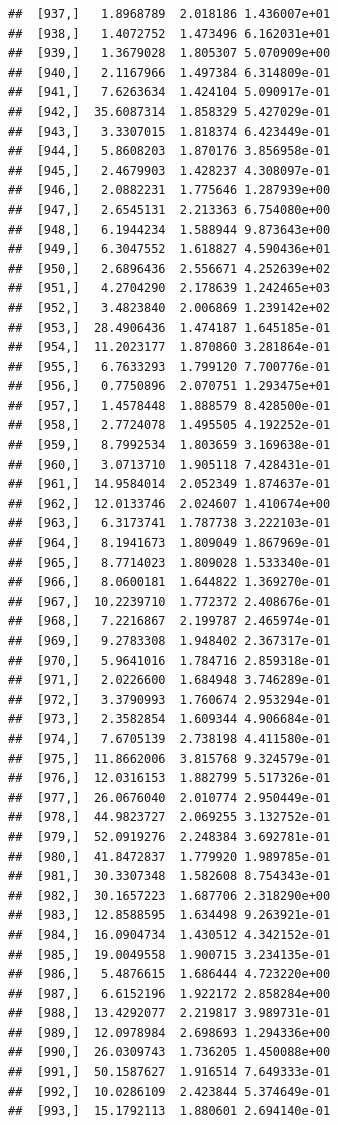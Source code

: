 \documentclass[article]{jss}\usepackage[]{graphicx}\usepackage[]{xcolor}
\makeatletter
\newenvironment{kframe}{%
 \def\at@end@of@kframe{}%
 \ifinner\ifhmode%
  \def\at@end@of@kframe{\end{minipage}}%
  \begin{minipage}{\columnwidth}%
 \fi\fi%
 \def\FrameCommand##1{\hskip\@totalleftmargin \hskip-\fboxsep
 \colorbox{shadecolor}{##1}\hskip-\fboxsep
     \hskip-\linewidth \hskip-\@totalleftmargin \hskip\columnwidth}%
 \MakeFramed {\advance\hsize-\width
   \@totalleftmargin\z@ \linewidth\hsize
   \@setminipage}}%
 {\par\unskip\endMakeFramed%
 \at@end@of@kframe}
\newenvironment{knitrout}{}{} %
\makeatother
\begin{document}
\begin{knitrout}
\begin{kframe}
\begin{verbatim}
##  [937,]   1.8968789  2.018186 1.436007e+01
##  [938,]   1.4072752  1.473496 6.162031e+01
##  [939,]   1.3679028  1.805307 5.070909e+00
##  [940,]   2.1167966  1.497384 6.314809e-01
##  [941,]   7.6263634  1.424104 5.090917e-01
##  [942,]  35.6087314  1.858329 5.427029e-01
##  [943,]   3.3307015  1.818374 6.423449e-01
##  [944,]   5.8608203  1.870176 3.856958e-01
##  [945,]   2.4679903  1.428237 4.308097e-01
##  [946,]   2.0882231  1.775646 1.287939e+00
##  [947,]   2.6545131  2.213363 6.754080e+00
##  [948,]   6.1944234  1.588944 9.873643e+00
##  [949,]   6.3047552  1.618827 4.590436e+01
##  [950,]   2.6896436  2.556671 4.252639e+02
##  [951,]   4.2704290  2.178639 1.242465e+03
##  [952,]   3.4823840  2.006869 1.239142e+02
##  [953,]  28.4906436  1.474187 1.645185e-01
##  [954,]  11.2023177  1.870860 3.281864e-01
##  [955,]   6.7633293  1.799120 7.700776e-01
##  [956,]   0.7750896  2.070751 1.293475e+01
##  [957,]   1.4578448  1.888579 8.428500e-01
##  [958,]   2.7724078  1.495505 4.192252e-01
##  [959,]   8.7992534  1.803659 3.169638e-01
##  [960,]   3.0713710  1.905118 7.428431e-01
##  [961,]  14.9584014  2.052349 1.874637e-01
##  [962,]  12.0133746  2.024607 1.410674e+00
##  [963,]   6.3173741  1.787738 3.222103e-01
##  [964,]   8.1941673  1.809049 1.867969e-01
##  [965,]   8.7714023  1.809028 1.533340e-01
##  [966,]   8.0600181  1.644822 1.369270e-01
##  [967,]  10.2239710  1.772372 2.408676e-01
##  [968,]   7.2216867  2.199787 2.465974e-01
##  [969,]   9.2783308  1.948402 2.367317e-01
##  [970,]   5.9641016  1.784716 2.859318e-01
##  [971,]   2.0226600  1.684948 3.746289e-01
##  [972,]   3.3790993  1.760674 2.953294e-01
##  [973,]   2.3582854  1.609344 4.906684e-01
##  [974,]   7.6705139  2.738198 4.411580e-01
##  [975,]  11.8662006  3.815768 9.324579e-01
##  [976,]  12.0316153  1.882799 5.517326e-01
##  [977,]  26.0676040  2.010774 2.950449e-01
##  [978,]  44.9823727  2.069255 3.132752e-01
##  [979,]  52.0919276  2.248384 3.692781e-01
##  [980,]  41.8472837  1.779920 1.989785e-01
##  [981,]  30.3307348  1.582608 8.754343e-01
##  [982,]  30.1657223  1.687706 2.318290e+00
##  [983,]  12.8588595  1.634498 9.263921e-01
##  [984,]  16.0904734  1.430512 4.342152e-01
##  [985,]  19.0049558  1.900715 3.234135e-01
##  [986,]   5.4876615  1.686444 4.723220e+00
##  [987,]   6.6152196  1.922172 2.858284e+00
##  [988,]  13.4292077  2.219817 3.989731e-01
##  [989,]  12.0978984  2.698693 1.294336e+00
##  [990,]  26.0309743  1.736205 1.450088e+00
##  [991,]  50.1587627  1.916514 7.649333e-01
##  [992,]  10.0286109  2.423844 5.374649e-01
##  [993,]  15.1792113  1.880601 2.694140e-01

\end{verbatim}
\end{kframe}
\end{knitrout}
\end{document}
